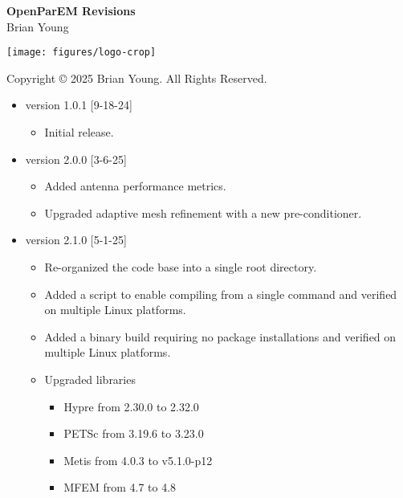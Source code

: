 \documentclass[titlepage]{article}
\renewcommand\_{\textunderscore\linebreak[1]}
\begin{document}
\begin{titlepage}

   \centering
   \vspace*{3cm}
   {\huge\bfseries OpenParEM Revisions} \\
   \vskip1cm
   {\Large Brian Young} \\

   \vfill

   \texttt{[image: figures/logo-crop]}

   \vspace*{\fill}
   Copyright \copyright{} 2025 Brian Young. All Rights Reserved.
\end{titlepage}

\begin{itemize}[nosep]

   \item version 1.0.1 [9-18-24]
      \begin{itemize}[nosep]
         \item Initial release.
      \end{itemize}

   \item version 2.0.0 [3-6-25]
      \begin{itemize}[nosep]
         \item Added antenna performance metrics.
         \item Upgraded adaptive mesh refinement with a new pre-conditioner.
      \end{itemize}

   \item version 2.1.0 [5-1-25]
      \begin{itemize}[nosep]
         \item Re-organized the code base into a single root directory.
         \item Added a script to enable compiling from a single command and verified on multiple Linux platforms.
         \item Added a binary build requiring no package installations and verified on multiple Linux platforms.
         \item Upgraded libraries
            \begin{itemize}[nosep]
               \item Hypre from 2.30.0 to 2.32.0
               \item PETSc from 3.19.6 to 3.23.0
               \item Metis from 4.0.3 to v5.1.0-p12
               \item MFEM from 4.7 to 4.8
            \end{itemize}
      \end{itemize}

\end{itemize}
\end{document}
